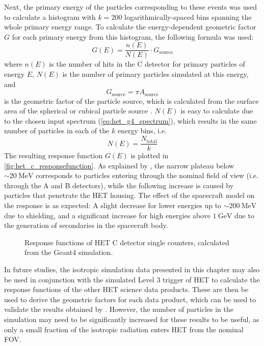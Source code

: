 Next, the primary energy of the particles corresponding to these events was used to calculate a histogram with $k=200$ logarithmically-spaced bins spanning the whole primary energy range. To calculate the energy-dependent geometric factor $G$ for each primary energy from this histogram, the following formula \citep[based on][equation 18]{Sullivan-1971} was used:
\begin{equation}
G(E) = \frac{n(E)}{N(E)} \cdot G_\text{source}
\end{equation}
where $n(E)$ is the number of hits in the C detector for primary particles of energy $E$, $N(E)$ is the number of primary particles simulated at this energy, and
\begin{equation}
G_\text{source} = \pi A_\text{source}
\end{equation}
is the geometric factor of the particle source, which is calculated from the surface area of the spherical or cubical particle source \citep[equation 6]{Sullivan-1971}. $N(E)$ is easy to calculate due to the chosen input spectrum (\autoref{eq:het_g4_spectrum}), which results in the same number of particles in each of the $k$ energy bins, i.e.
\begin{equation}
N(E) = \frac{N_\text{total}}{k}
\end{equation}
The resulting response function $G(E)$ is plotted in \autoref{fig:het_c_responsefunction}. As explained by \citet[Section 2.1]{Forstner-2021-SolO}, the narrow plateau below $\sim\SI{20}{\mega\electronvolt}$ corresponds to particles entering through the nominal field of view (i.e. through the A and B detectors), while the following increase is caused by particles that penetrate the \ac{HET} housing. The effect of the spacecraft model on the response is as expected: A slight decrease for lower energies up to $\sim\SI{200}{\mega\electronvolt}$ due to shielding, and a significant increase for high energies above $\SI{1}{\giga\electronvolt}$ due to the generation of secondaries in the spacecraft body.

\begin{figure}
	\centering
	
	\caption[Response functions of \acs{HET} C detector single counters]{Response functions of \ac{HET} C detector single counters, calculated from the \ac{Geant4} simulation.}
	\label{fig:het_c_responsefunction}
\end{figure}

In future studies, the isotropic simulation data presented in this chapter may also be used in conjunction with the simulated Level 3 trigger of HET to calculate the response functions of the other \ac{HET} science data products. These are then be used to derive the geometric factors for each data product, which can be used to validate the results obtained by \citet{Elftmann-2020-PhD}. However, the number of particles in the simulation may need to be significantly increased for these results to be useful, as only a small fraction of the isotropic radiation enters HET from the nominal \ac{FOV}.